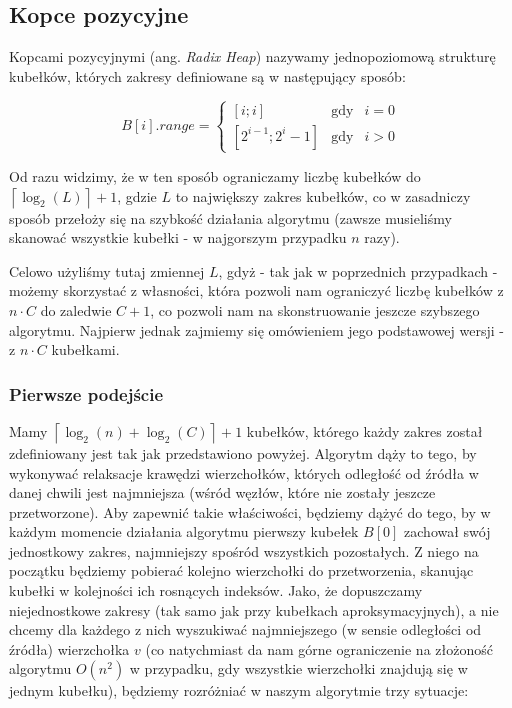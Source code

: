 \newpage
\subsection{Kopce pozycyjne}

Kopcami pozycyjnymi (ang. \textit{Radix Heap}) nazywamy jednopoziomową strukturę kubełków, których zakresy definiowane są w następujący sposób:

\begin{equation}
B \left[ i \right].range = \left\{\begin{matrix}
 \left[ i ; i \right ]& \textrm{gdy} & i = 0 \\ 
 \left[ 2^{i-1} ; 2^{i} - 1 \right ]& \textrm{gdy} & i > 0
\end{matrix}\right.
\end{equation}

Od razu widzimy, że w ten sposób ograniczamy liczbę kubełków do $ \left \lceil \log_{2} \left( L \right) \right \rceil + 1$, gdzie $L$ to największy zakres kubełków, co w zasadniczy sposób przełoży się na szybkość działania algorytmu (zawsze musieliśmy skanować wszystkie kubełki - w najgorszym przypadku $n$ razy).

Celowo użyliśmy tutaj zmiennej $L$, gdyż - tak jak w poprzednich przypadkach - możemy skorzystać z własności, która pozwoli nam ograniczyć liczbę kubełków z $n \cdot C$ do zaledwie $C + 1$, co pozwoli nam na skonstruowanie jeszcze szybszego algorytmu. Najpierw jednak zajmiemy się omówieniem jego podstawowej wersji - z $n \cdot C$ kubełkami.

\subsubsection{Pierwsze podejście}

Mamy $ \left \lceil \log_{2} \left( n \right) + \log_{2} \left( C \right) \right \rceil + 1$ kubełków, którego każdy zakres został zdefiniowany jest tak jak przedstawiono powyżej. Algorytm dąży to tego, by wykonywać relaksacje krawędzi wierzchołków, których odległość od źródła w danej chwili jest najmniejsza (wśród węzłów, które nie zostały jeszcze przetworzone). Aby zapewnić takie właściwości, będziemy dążyć do tego, by w każdym momencie działania algorytmu pierwszy kubełek $B \left[ 0 \right]$ zachował swój jednostkowy zakres, najmniejszy spośród wszystkich pozostałych. Z niego na początku będziemy pobierać kolejno wierzchołki do przetworzenia, skanując kubełki w kolejności ich rosnących indeksów. Jako, że dopuszczamy niejednostkowe zakresy (tak samo jak przy kubełkach aproksymacyjnych), a nie chcemy dla każdego z nich wyszukiwać najmniejszego (w sensie odległości od źródła) wierzchołka $v$ (co natychmiast da nam górne ograniczenie na złożoność algorytmu $ O \left( n ^{2} \right)$ w przypadku, gdy wszystkie wierzchołki znajdują się w jednym kubełku), będziemy rozróżniać w naszym algorytmie trzy sytuacje:

